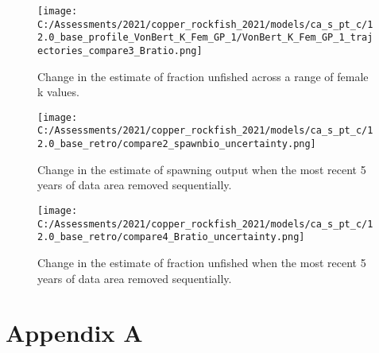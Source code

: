 \documentclass[11pt,
  english,
  a4paper,
]{article}
\begin{document}
\tagmcend\tagstructend


\begin{figure}
\centering
\texttt{[image: C:/Assessments/2021/copper\_rockfish\_2021/models/ca\_s\_pt\_c/12.0\_base\_profile\_VonBert\_K\_Fem\_GP\_1/VonBert\_K\_Fem\_GP\_1\_trajectories\_compare3\_Bratio.png]}
\caption{Change in the estimate of fraction unfished across a range of female k values.\label{fig:k-depl}}
\end{figure}

\tagmcend\tagstructend


\begin{figure}
\centering
\texttt{[image: C:/Assessments/2021/copper\_rockfish\_2021/models/ca\_s\_pt\_c/12.0\_base\_retro/compare2\_spawnbio\_uncertainty.png]}
\caption{Change in the estimate of spawning output when the most recent 5 years of data area removed sequentially.\label{fig:retro-ssb}}
\end{figure}

\tagmcend\tagstructend


\begin{figure}
\centering
\texttt{[image: C:/Assessments/2021/copper\_rockfish\_2021/models/ca\_s\_pt\_c/12.0\_base\_retro/compare4\_Bratio\_uncertainty.png]}
\caption{Change in the estimate of fraction unfished when the most recent 5 years of data area removed sequentially.\label{fig:retro-depl}}
\end{figure}

\tagmcend\tagstructend

\newpage

\clearpage


\hypertarget{appendix-a}{%
\section{Appendix A}\label{appendix-a}}
\end{document}
